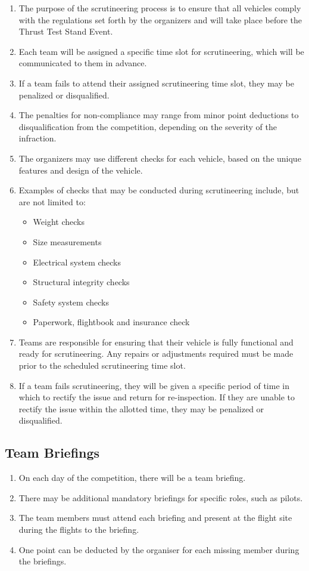     \begin{enumerate}
    \item The purpose of the scrutineering process is to ensure that all vehicles comply with the regulations set forth by the organizers and will take place before the Thrust Test Stand Event.    \item Each team will be assigned a specific time slot for scrutineering, which will be communicated to them in advance.
    \item If a team fails to attend their assigned scrutineering time slot, they may be penalized or disqualified.
    \item The penalties for non-compliance may range from minor point deductions to disqualification from the competition, depending on the severity of the infraction.
    \item The organizers may use different checks for each vehicle, based on the unique features and design of the vehicle.
    \item Examples of checks that may be conducted during scrutineering include, but are not limited to:
    \begin{itemize}
    \item Weight checks
    \item Size measurements 
    \item Electrical system checks
    \item Structural integrity checks
    \item Safety system checks
    \item Paperwork, flightbook and insurance check
    \end{itemize}
    \item Teams are responsible for ensuring that their vehicle is fully functional and ready for scrutineering. Any repairs or adjustments required must be made prior to the scheduled scrutineering time slot.
    \item If a team fails scrutineering, they will be given a specific period of time in which to rectify the issue and return for re-inspection. If they are unable to rectify the issue within the allotted time, they may be penalized or disqualified.
    \end{enumerate}

    \subsection{Team Briefings}
    \begin{enumerate}
      \item On each day of the competition, there will be a team briefing.
      \item There may be additional mandatory briefings for specific roles, such as pilots.
      \item The team members must attend each briefing and present at the flight site during the flights to the briefing.
      \item One point can be deducted by the organiser for each missing member during the briefings.
    \end{enumerate}

